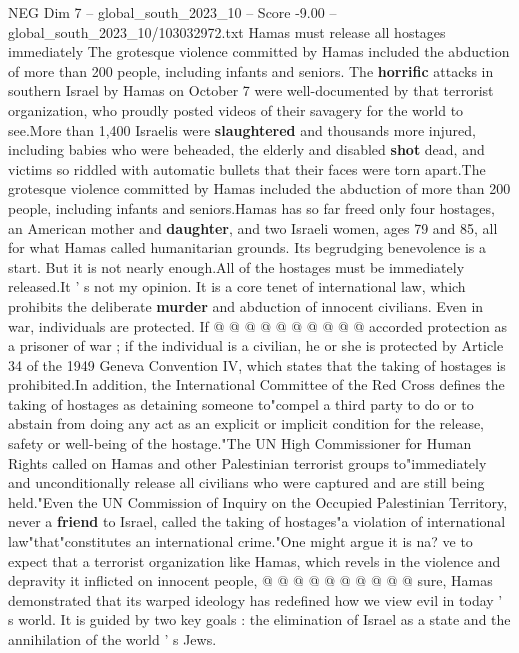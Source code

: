 \begin{textsample}{NEG Dim 7 – global\_south\_2023\_10 – Score -9.00 – global\_south\_2023\_10/103032972.txt}  \label{ex:f7_neg_312}
Hamas must release all hostages immediately The grotesque violence committed by Hamas included the abduction of more than 200 people, including infants and seniors.
The \textbf{horrific} attacks in southern Israel by Hamas on October 7 were well-documented by that terrorist organization, who proudly posted videos of their savagery for the world to see.More than 1,400 Israelis were \textbf{slaughtered} and thousands more injured, including babies who were beheaded, the elderly and disabled \textbf{shot} dead, and victims so riddled with automatic bullets that their faces were torn apart.The grotesque violence committed by Hamas included the abduction of more than 200 people, including infants and seniors.Hamas has so far freed only four hostages, an American mother and \textbf{daughter}, and two Israeli women, ages 79 and 85, all for what Hamas called humanitarian grounds.
Its begrudging benevolence is a start.
But it is not nearly enough.All of the hostages must be immediately released.It ' s not my opinion.
It is a core tenet of international law, which prohibits the deliberate \textbf{murder} and abduction of innocent civilians.
Even in war, individuals are protected.
If @ @ @ @ @ @ @ @ @ @ accorded protection as a prisoner of war ; if the individual is a civilian, he or she is protected by Article 34 of the 1949 Geneva Convention IV, which states that the taking of hostages is prohibited.In addition, the International Committee of the Red Cross defines the taking of hostages as detaining someone to"compel a third party to do or to abstain from doing any act as an explicit or implicit condition for the release, safety or well-being of the hostage."The UN High Commissioner for Human Rights called on Hamas and other Palestinian terrorist groups to"immediately and unconditionally release all civilians who were captured and are still being held."Even the UN Commission of Inquiry on the Occupied Palestinian Territory, never a \textbf{friend} to Israel, called the taking of hostages"a violation of international law"that"constitutes an international crime."One might argue it is na? ve to expect that a terrorist organization like Hamas, which revels in the violence and depravity it inflicted on innocent people, @ @ @ @ @ @ @ @ @ @ sure, Hamas demonstrated that its warped ideology has redefined how we view evil in today ' s world.
It is guided by two key goals : the elimination of Israel as a state and the annihilation of the world ' s Jews.

\end{textsample}
